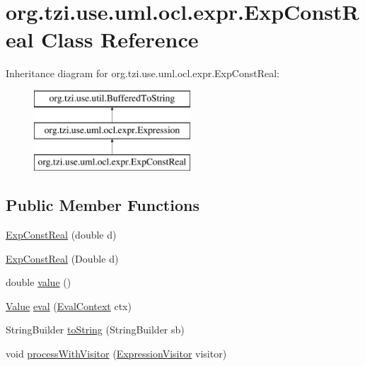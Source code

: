 \hypertarget{classorg_1_1tzi_1_1use_1_1uml_1_1ocl_1_1expr_1_1_exp_const_real}{\section{org.\-tzi.\-use.\-uml.\-ocl.\-expr.\-Exp\-Const\-Real Class Reference}
\label{classorg_1_1tzi_1_1use_1_1uml_1_1ocl_1_1expr_1_1_exp_const_real}
}
Inheritance diagram for org.\-tzi.\-use.\-uml.\-ocl.\-expr.\-Exp\-Const\-Real\-:\begin{figure}[H]
\begin{center}
\leavevmode
\includegraphics[height=3.000000cm]{classorg_1_1tzi_1_1use_1_1uml_1_1ocl_1_1expr_1_1_exp_const_real}
\end{center}
\end{figure}
\subsection*{Public Member Functions}
\begin{DoxyCompactItemize}
\item 
\hyperlink{classorg_1_1tzi_1_1use_1_1uml_1_1ocl_1_1expr_1_1_exp_const_real_a8767f992710f5c2cf658d8d779a47170}{Exp\-Const\-Real} (double d)
\item 
\hyperlink{classorg_1_1tzi_1_1use_1_1uml_1_1ocl_1_1expr_1_1_exp_const_real_ade2838bd339bf3b26a0f18d768e16fa8}{Exp\-Const\-Real} (Double d)
\item 
double \hyperlink{classorg_1_1tzi_1_1use_1_1uml_1_1ocl_1_1expr_1_1_exp_const_real_a3072372122a875a21326e8eaeff04b45}{value} ()
\item 
\hyperlink{classorg_1_1tzi_1_1use_1_1uml_1_1ocl_1_1value_1_1_value}{Value} \hyperlink{classorg_1_1tzi_1_1use_1_1uml_1_1ocl_1_1expr_1_1_exp_const_real_ac08cff697e6fb23ce256e35d322917c3}{eval} (\hyperlink{classorg_1_1tzi_1_1use_1_1uml_1_1ocl_1_1expr_1_1_eval_context}{Eval\-Context} ctx)
\item 
String\-Builder \hyperlink{classorg_1_1tzi_1_1use_1_1uml_1_1ocl_1_1expr_1_1_exp_const_real_ad2c75a3cb9140871ceef86d2362636bc}{to\-String} (String\-Builder sb)
\item 
void \hyperlink{classorg_1_1tzi_1_1use_1_1uml_1_1ocl_1_1expr_1_1_exp_const_real_a2b5903f6412798059b55ec37b425ad81}{process\-With\-Visitor} (\hyperlink{interfaceorg_1_1tzi_1_1use_1_1uml_1_1ocl_1_1expr_1_1_expression_visitor}{Expression\-Visitor} visitor)
\end{DoxyCompactItemize}

